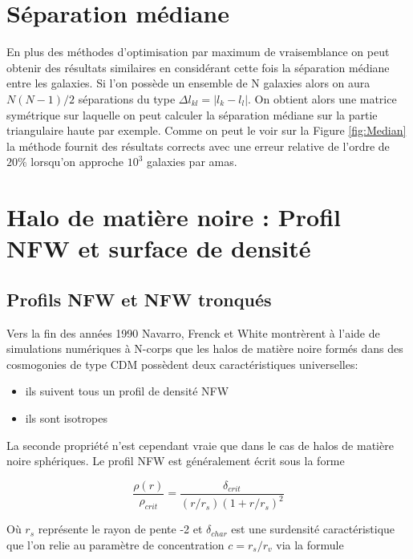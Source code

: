 \documentclass[a4paper,11pt]{article}
\numberwithin{equation}{section}
\begin{document}
  \section{Séparation médiane}
    En plus des méthodes d'optimisation par maximum de vraisemblance on peut obtenir des résultats similaires en considérant cette fois la séparation médiane entre les galaxies.\newline %
    Si l'on possède un ensemble de N galaxies alors on aura $N(N-1)/2$ séparations du type $\Delta l_{kl} = \vert l_k - l_l \vert$. On obtient alors une matrice symétrique sur laquelle on peut calculer la séparation médiane sur la partie triangulaire haute par exemple.\newline
Comme on peut le voir sur la Figure \ref{fig:Median} la méthode fournit des résultats corrects avec une erreur relative de l'ordre de $20\%$ lorsqu'on approche $10^3$ galaxies par amas.
  \newpage
  
  \section{Halo de matière noire : Profil NFW et surface de densité}
  \subsection{Profils NFW et NFW tronqués}
    Vers la fin des années 1990 Navarro, Frenck et White montrèrent à l'aide de simulations numériques à N-corps que les halos de matière noire formés dans des cosmogonies de type CDM possèdent deux caractéristiques universelles:
    
    \begin{itemize}    %
      \item ils suivent tous un profil de densité NFW
      \item ils sont isotropes
    \end{itemize}

    La seconde propriété n'est cependant vraie que dans le cas de halos de matière noire sphériques. Le profil NFW est généralement écrit sous la forme\cite{NFW1996}
    
    \begin{equation}
      \label{eq:NFW_profile}
      \frac{\rho(r)}{\rho_{crit}} = \frac{\delta_{crit}}{(r/r_s) ( 1 + r / r_s)^2}  %
    \end{equation}
    
    Où $r_s$ représente le rayon de pente -2 et $\delta_{char}$ est une surdensité caractéristique que l'on relie au paramètre de concentration $c = r_s / r_v$ via la formule\cite{Mo_concentration}
    
\end{document}
